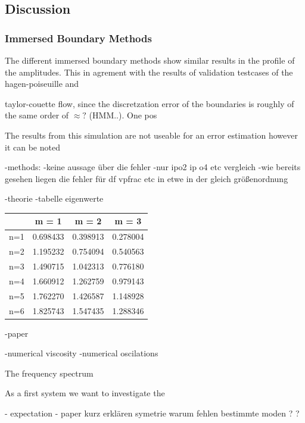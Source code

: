 \subsection{Discussion}

\subsubsection{Immersed Boundary Methods}

The different immersed boundary methods show similar results in the profile of the amplitudes. This in agrement with the results of validation testcases of the hagen-poiseuille and

taylor-couette flow, since the discretzation error of the boundaries is roughly of the same order of $\approx?$ (HMM..).
One pos


The results from this simulation are not useable for an error estimation however it can be noted




-methods:
-keine aussage über die fehler
-nur ipo2 ip o4 etc vergleich
-wie bereits gesehen liegen die fehler für df vpfrac etc in etwe in der gleich größenordnung

-theorie
-tabelle eigenwerte

\begin{center}
    \begin{tabular}{cccc}
            &    m =  1  & m = 2   & m = 3 \\ \hline
        n=1 &   0.698433 &0.398913 &0.278004\\
        n=2 &   1.195232 &0.754094 &0.540563\\
        n=3 &   1.490715 &1.042313 &0.776180\\
        n=4 &   1.660912 &1.262759 &0.979143\\
        n=5 &   1.762270 &1.426587 &1.148928\\
        n=6 &   1.825743 &1.547435 &1.288346\\ \hline
    \end{tabular}
\end{center}

-paper

-numerical viscosity
-numerical oscilations


The frequency spectrum





As a first system we want to investigate the

- expectation
- paper kurz erklären symetrie warum fehlen bestimmte moden ? ?

